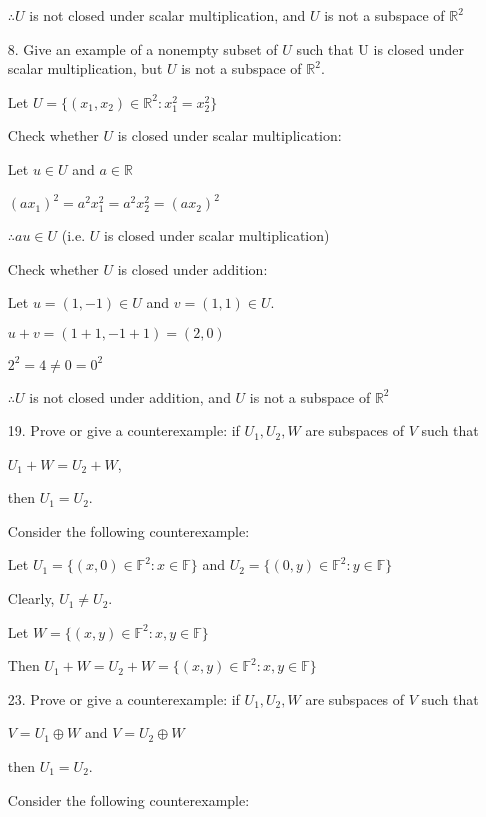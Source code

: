 \documentclass{article}
\begin{document}
\begin{enumerate}[nolistsep]
		$\therefore U$ is not closed under scalar multiplication, and $U$ is not a subspace of $\mathbb{R}^2$
		
		\item[8.] Give an example of a nonempty subset of $U$ such that U is closed under scalar multiplication, but $U$ is not a subspace of $\mathbb{R}^2$.
		
		Let $U = \{(x_1, x_2) \in \mathbb{R}^2 : x_1^2 = x_2^2\}$
		
		Check whether $U$ is closed under scalar multiplication:
		
		Let $u \in U$ and $a \in \mathbb{R}$
		
		$(ax_1)^2 = a^2x_1^2 = a^2x_2^2 = (ax_2)^2$
		
		$\therefore au \in U$ (i.e. $U$ is closed under scalar multiplication)
		
		Check whether $U$ is closed under addition:
		
		Let $u = (1, -1) \in U$ and $v = (1, 1) \in U$.
		
		$u + v = (1 + 1, -1 + 1) = (2, 0)$
		
		$2^2 = 4 \neq 0 = 0^2$
		
		$\therefore U$ is not closed under addition, and $U$ is not a subspace of $\mathbb{R}^2$
		
		\item[19.] Prove or give a counterexample: if $U_1, U_2, W$ are subspaces of $V$ such that
		
\centerline{$U_1 + W = U_2 + W$,}

then $U_1 = U_2$. 
		
		Consider the following counterexample:

		Let $U_1 = \{(x, 0) \in \mathbb{F}^2 : x \in \mathbb{F}\}$ and $U_2 = \{(0, y) \in \mathbb{F}^2 : y \in \mathbb{F}\}$
		
		Clearly, $U_1 \neq U_2$.
		
		Let $W = \{(x, y) \in \mathbb{F}^2 : x, y \in \mathbb{F}\}$
		
		Then $U_1 + W = U_2 + W = \{(x, y) \in \mathbb{F}^2 : x, y \in \mathbb{F}\}$
		
		\item[23.] Prove or give a counterexample: if $U_1, U_2, W$ are subspaces of $V$ such that
		
		\centerline{$V = U_1 \oplus W$ and $V = U_2 \oplus W$}
		
		then $U_1 = U_2$.
		
		Consider the following counterexample:
		

\end{enumerate}
\end{document}
